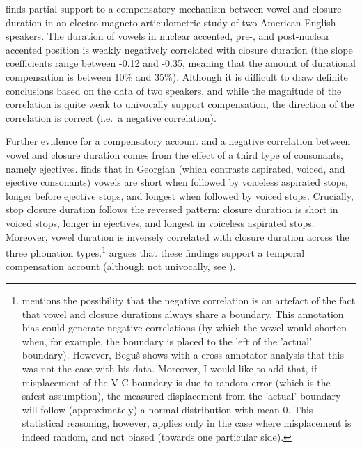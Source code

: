 \documentclass[12pt,]{article}
\let\rmarkdownfootnote\footnote%
\def\footnote{\protect\rmarkdownfootnote}
\begin{document}
\citet{de-jong1991} finds partial support to a compensatory mechanism
between vowel and closure duration in an electro-magneto-articulometric
study of two American English speakers. The duration of vowels in
nuclear accented, pre-, and post-nuclear accented position is weakly
negatively correlated with closure duration (the slope coefficients
range between -0.12 and -0.35, meaning that the amount of durational
compensation is between 10\% and 35\%). Although it is difficult to draw
definite conclusions based on the data of two speakers, and while the
magnitude of the correlation is quite weak to univocally support
compensation, the direction of the correlation is correct (i.e.~a
negative correlation).

Further evidence for a compensatory account and a negative correlation
between vowel and closure duration comes from the effect of a third type
of consonants, namely ejectives. \citet{begus2017} finds that in
Georgian (which contrasts aspirated, voiced, and ejective consonants)
vowels are short when followed by voiceless aspirated stops, longer
before ejective stops, and longest when followed by voiced stops.
Crucially, stop closure duration follows the reversed pattern: closure
duration is short in voiced stops, longer in ejectives, and longest in
voiceless aspirated stops. Moreover, vowel duration is inversely
correlated with closure duration across the three phonation
types.\footnote{\citet{begus2017} mentions the possibility that the negative correlation is an artefact of the fact that vowel and closure durations always share a boundary. This annotation bias could generate negative correlations (by which the vowel would shorten when, for example, the boundary is placed to the left of the 'actual' boundary). However, Beguš shows with a cross-annotator analysis that this was not the case with his data. Moreover, I would like to add that, if misplacement of the V-C boundary is due to random error (which is the safest assumption), the measured displacement from the 'actual' boundary will follow (approximately) a normal distribution with mean 0. This statistical reasoning, however, applies only in the case where misplacement is indeed random, and not biased (towards one particular side).}
\citet{begus2017} argues that these findings support a temporal
compensation account (although not univocally, see
\citealt[Section V]{begus2017}).
\end{document}
